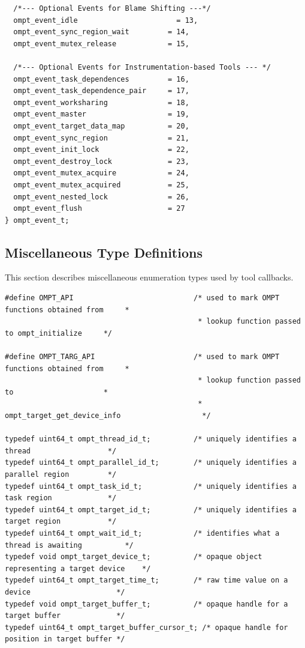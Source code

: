 \documentclass{article}
\begin{document}
{\begin{verbatim}
  /*--- Optional Events for Blame Shifting ---*/  	
  ompt_event_idle	                    = 13,   
  ompt_event_sync_region_wait         = 14, 
  ompt_event_mutex_release            = 15, 

  /*--- Optional Events for Instrumentation-based Tools --- */      	      
  ompt_event_task_dependences         = 16,  
  ompt_event_task_dependence_pair     = 17,   				    				   	
  ompt_event_worksharing              = 18,  		              	 			    
  ompt_event_master                   = 19,  
  ompt_event_target_data_map          = 20, 	          	 			   
  ompt_event_sync_region              = 21,  
  ompt_event_init_lock                = 22,  
  ompt_event_destroy_lock             = 23, 								    
  ompt_event_mutex_acquire            = 24,  
  ompt_event_mutex_acquired           = 25,  
  ompt_event_nested_lock              = 26,   			            	 			         
  ompt_event_flush                    = 27  
} ompt_event_t;
\end{verbatim}

\clearpage  
\subsection{Miscellaneous Type Definitions}
\label{appendix:ompt-types:misc}
This section describes miscellaneous enumeration types used by tool callbacks.

\begin{verbatim}
#define OMPT_API                            /* used to mark OMPT functions obtained from     *
                                             * lookup function passed to ompt_initialize     */ 
                                             
#define OMPT_TARG_API                       /* used to mark OMPT functions obtained from     *
                                             * lookup function passed to                     *
                                             * ompt_target_get_device_info                   */
                                             
typedef uint64_t ompt_thread_id_t;          /* uniquely identifies a thread                  */ 
typedef uint64_t ompt_parallel_id_t;        /* uniquely identifies a parallel region         */
typedef uint64_t ompt_task_id_t;            /* uniquely identifies a task region             */
typedef uint64_t ompt_target_id_t;          /* uniquely identifies a target region           */
typedef uint64_t ompt_wait_id_t;            /* identifies what a thread is awaiting          */
typedef void ompt_target_device_t;          /* opaque object representing a target device    */
typedef uint64_t ompt_target_time_t;        /* raw time value on a device                    */
typedef void ompt_target_buffer_t;          /* opaque handle for a target buffer             */ 
typedef uint64_t ompt_target_buffer_cursor_t; /* opaque handle for position in target buffer */


\end{verbatim}}
\end{document}
